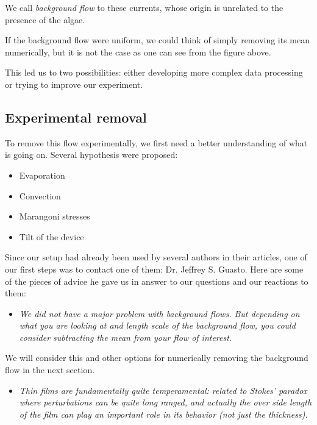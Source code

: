 We call \textit{background flow} to these currents, whose origin is unrelated to the presence of the algae.

If the background flow were uniform, we could think of simply removing its mean numerically, but it is not the case as one can see from the figure above. 

This led us to two possibilities: either developing more complex data processing or trying to improve our experiment. 

\subsection{Experimental removal}

To remove this flow experimentally, we first need a better understanding of what is going on. Several hypothesis were proposed:

\begin{itemize}
	\item Evaporation
	\item Convection
	\item Marangoni stresses
	\item Tilt of the device
\end{itemize}

Since our setup had already been used by several authors in their articles, one of our first steps was to contact one of them: Dr. Jeffrey S. Guasto. Here are some of the pieces of advice he gave us in answer to our questions and our reactions to them:

\begin{itemize}
	\item \textit{We did not have a major problem with background flows. But depending on what you are looking at and length scale of the background flow, you could consider subtracting the mean from your flow of interest.}
\end{itemize}

We will consider this and other options for numerically removing the background flow in the next section.

\begin{itemize}
	\item \textit{Thin films are fundamentally quite temperamental: related to Stokes' paradox where perturbations can be quite long ranged, and actually the over side length of the film can play an important role in its behavior (not just the thickness).}
\end{itemize}

